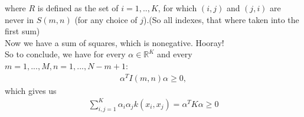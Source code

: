 \documentclass[a4paper]{article}
\newcommand{\1}{\mathds{1}}
\begin{document}
where $R$ is defined as the set of $i=1,..,K$, for which $(i,j)$ and $(j,i)$ are never in $S(m,n)$ (for any choice of $j$).(So all indexes, that where taken into the first sum)\\
Now we have a sum of squares, which is nonegative. Hooray!\\
So to conclude, we have for every $\alpha\in\mathbb{R}^K$ and every $m=1,...,M,n=1,...,N-m+1$:
\begin{align*}
\alpha^TI(m,n)\alpha\geq 0,
\end{align*}
which gives us
\begin{align*}
\sum_{i,j=1}^{K}\alpha_i\alpha_jk(x_i,x_j)
=\alpha^TK\alpha\geq 0
\end{align*}
\end{document}

